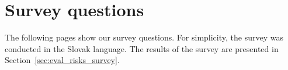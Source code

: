 \setcounter{figure}{0}
\setcounter{listing}{0}

\chapter{Survey questions \label{cha:survey} }
The following pages show our survey questions. For simplicity, the survey was conducted in the Slovak language. The results of the survey are presented in Section~\ref{sec:eval_risks_survey}.

\newpage
\thispagestyle{empty}

% 


\newpage

\thispagestyle{empty}
\mbox{}
\newpage


